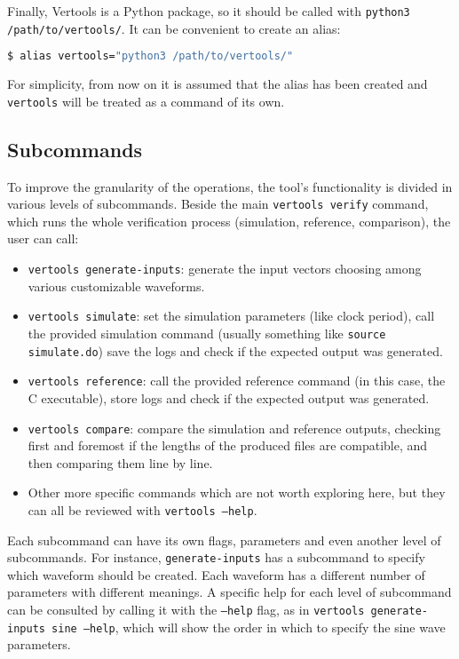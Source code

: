 Finally, Vertools is a Python package, so it should be called with \texttt{python3 /path/to/vertools/}. It can be convenient to create an alias:
\begin{lstlisting}[language=bash]
    $ alias vertools="python3 /path/to/vertools/"
\end{lstlisting}

For simplicity, from now on it is assumed that the alias has been created and \texttt{vertools} will be treated as a command of its own.

\subsection{Subcommands}
To improve the granularity of the operations, the tool's functionality is divided in various levels of subcommands. Beside the main \texttt{vertools verify} command, which runs the whole verification process (simulation, reference, comparison), the user can call:

\begin{itemize}
    \item \texttt{vertools generate-inputs}: generate the input vectors choosing among various customizable waveforms.
    \item \texttt{vertools simulate}: set the simulation parameters (like clock period), call the provided simulation command (usually something like \texttt{source simulate.do}) save the logs and check if the expected output was generated.
    \item \texttt{vertools reference}: call the provided reference command (in this case, the C executable), store logs and check if the expected output was generated.
    \item \texttt{vertools compare}: compare the simulation and reference outputs, checking first and foremost if the lengths of the produced files are compatible, and then comparing them line by line.
    \item Other more specific commands which are not worth exploring here, but they can all be reviewed with \texttt{vertools --help}.
\end{itemize}

Each subcommand can have its own flags, parameters and even another level of subcommands. For instance, \texttt{generate-inputs} has a subcommand to specify which waveform should be created. Each waveform has a different number of parameters with different meanings. A specific help for each level of subcommand can be consulted by calling it with the \texttt{--help} flag, as in \texttt{vertools generate-inputs sine --help}, which will show the order in which to specify the sine wave parameters.


